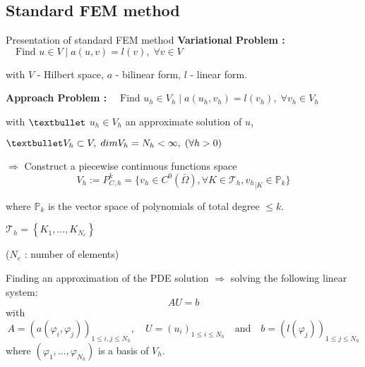 \subsection{Standard FEM method}

\begin{frame}{Presentation of standard FEM method}	    
    \textbf{Variational Problem :} $\quad\text{Find } u\in V \; | \; a(u,v)=l(v), \;\forall v\in V$
    
    with $V$ - Hilbert space, $a$ - bilinear form, $l$ - linear form.

    \vspace{10pt}

    \begin{minipage}[t]{0.76\linewidth}
        \textbf{Approach Problem :} $\quad \text{Find } u_h\in V_h \; | \; a(u_h,v_h)=l(v_h), \;\forall v_h\in V_h$
    
        with $\textbullet$ $u_h\in V_h$ an approximate solution of $u$, 
        
        $\textbullet V_h\subset V, \; dim V_h=N_h<\infty, \; (\forall h>0)$ 
        
       $\Rightarrow$ Construct a piecewise continuous functions space
       \vspace{-5pt}
       \begin{equation*}
           V_h:=P_{C,h}^k=\{v_h\in C^0(\bar{\Omega}), \forall K\in\mathcal{T}_h, {v_h}_{|K}\in\mathbb{P}_k\}
       \end{equation*}

       where $\mathbb{P}_k$ is the vector space of polynomials of total degree $\le k$.
    \end{minipage} \hfill \begin{minipage}[t][][b]{0.2\linewidth}
        \vspace{-5pt}
        \centering
        
        \footnotesize
        $\mathcal{T}_h = \left\{K_1,\dots,K_{N_e}\right\}$

        \tiny
        ($N_e$ : number of elements)
    \end{minipage}

    

    \vspace{10pt}

    Finding an approximation of the PDE solution $\Rightarrow$ solving the following linear system:
    \begin{equation*}
        AU=b
    \end{equation*}
    with
    \begin{equation*}
        A=(a(\varphi_i,\varphi_j))_{1\le i,j\le N_h}, \quad U=(u_i)_{1\le i\le N_h} \quad \text{and} \quad b=(l(\varphi_j))_{1\le j\le N_h}
    \end{equation*}
    where $(\varphi_1,\dots,\varphi_{N_h})$ is a basis of $V_h$.
\end{frame}
	
